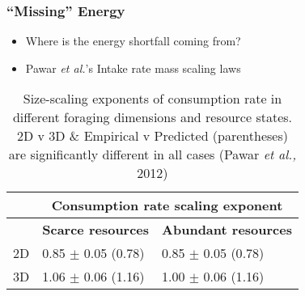 \documentclass[handout]{beamer}
\begin{document}
\begin{frame}
	\frametitle{``Missing'' Energy}
	\begin{itemize}
		\item Where is the energy shortfall coming from?
		\item Pawar \textit{et al.}'s Intake rate mass scaling laws
	\end{itemize}
	\begin{table}
		\tiny
		\caption{Size-scaling exponents of consumption rate in different foraging dimensions and resource states. 2D v 3D \& Empirical v Predicted (parentheses) are significantly different in all cases (Pawar \textit{et al.,} 2012)}
		\begin{tabularx}{\linewidth}{|X|X|X|}
		\toprule
		& \multicolumn{2}{c}{\textbf{Consumption rate scaling exponent}}                                        \\
		\midrule
		& \multicolumn{1}{c}{\textbf{Scarce resources}} & \multicolumn{1}{c}{\textbf{Abundant resources}} \\
		\midrule
		2D & 0.85 $\pm$ 0.05 (0.78)                      & 0.85 $\pm$ 0.05 (0.78)                        \\
		\midrule
		3D & 1.06 $\pm$ 0.06 (1.16)                      & 1.00 $\pm$ 0.06 (1.16)                       \\              
		\bottomrule
		\end{tabularx}
	\end{table}
\end{frame}
\end{document}
